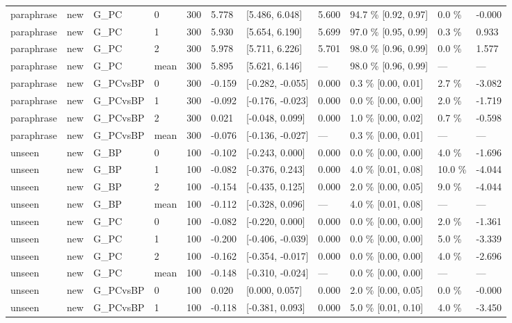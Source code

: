 \documentclass[10pt,a4paper]{article}
\begin{document}
\begin{center}
\begin{tabularx}{\textwidth}{@{}p{}XXXXXXXXXX@{}}
paraphrase & new & G\_PC & 0 & 300 & 5.778 & [5.486, 6.048] & 5.600 & 94.7 \% [0.92, 0.97] & 0.0 \% & -0.000 \\
paraphrase & new & G\_PC & 1 & 300 & 5.930 & [5.654, 6.190] & 5.699 & 97.0 \% [0.95, 0.99] & 0.3 \% & 0.933 \\
paraphrase & new & G\_PC & 2 & 300 & 5.978 & [5.711, 6.226] & 5.701 & 98.0 \% [0.96, 0.99] & 0.0 \% & 1.577 \\
paraphrase & new & G\_PC & mean & 300 & 5.895 & [5.621, 6.146] & — & 98.0 \% [0.96, 0.99] & — & — \\
paraphrase & new & G\_PCvsBP & 0 & 300 & -0.159 & [-0.282, -0.055] & 0.000 & 0.3 \% [0.00, 0.01] & 2.7 \% & -3.082 \\
paraphrase & new & G\_PCvsBP & 1 & 300 & -0.092 & [-0.176, -0.023] & 0.000 & 0.0 \% [0.00, 0.00] & 2.0 \% & -1.719 \\
paraphrase & new & G\_PCvsBP & 2 & 300 & 0.021 & [-0.048, 0.099] & 0.000 & 1.0 \% [0.00, 0.02] & 0.7 \% & -0.598 \\
paraphrase & new & G\_PCvsBP & mean & 300 & -0.076 & [-0.136, -0.027] & — & 0.3 \% [0.00, 0.01] & — & — \\
unseen & new & G\_BP & 0 & 100 & -0.102 & [-0.243, 0.000] & 0.000 & 0.0 \% [0.00, 0.00] & 4.0 \% & -1.696 \\
unseen & new & G\_BP & 1 & 100 & -0.082 & [-0.376, 0.243] & 0.000 & 4.0 \% [0.01, 0.08] & 10.0 \% & -4.044 \\
unseen & new & G\_BP & 2 & 100 & -0.154 & [-0.435, 0.125] & 0.000 & 2.0 \% [0.00, 0.05] & 9.0 \% & -4.044 \\
unseen & new & G\_BP & mean & 100 & -0.112 & [-0.328, 0.096] & — & 4.0 \% [0.01, 0.08] & — & — \\
unseen & new & G\_PC & 0 & 100 & -0.082 & [-0.220, 0.000] & 0.000 & 0.0 \% [0.00, 0.00] & 2.0 \% & -1.361 \\
unseen & new & G\_PC & 1 & 100 & -0.200 & [-0.406, -0.039] & 0.000 & 0.0 \% [0.00, 0.00] & 5.0 \% & -3.339 \\
unseen & new & G\_PC & 2 & 100 & -0.162 & [-0.354, -0.017] & 0.000 & 0.0 \% [0.00, 0.00] & 4.0 \% & -2.696 \\
unseen & new & G\_PC & mean & 100 & -0.148 & [-0.310, -0.024] & — & 0.0 \% [0.00, 0.00] & — & — \\
unseen & new & G\_PCvsBP & 0 & 100 & 0.020 & [0.000, 0.057] & 0.000 & 2.0 \% [0.00, 0.05] & 0.0 \% & -0.000 \\
unseen & new & G\_PCvsBP & 1 & 100 & -0.118 & [-0.381, 0.093] & 0.000 & 5.0 \% [0.01, 0.10] & 4.0 \% & -3.450 \\

\end{tabularx}
\end{center}
\end{document}
